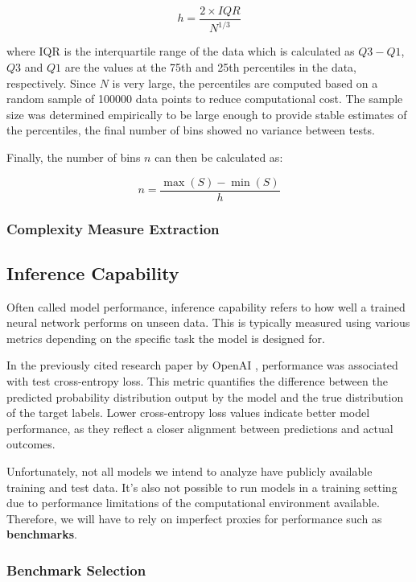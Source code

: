         \[ h = \frac{2 \times IQR}{N^{1/3}} \]

        where IQR is the interquartile range of the data which is calculated as \( Q3 - Q1 \), \( Q3 \) and \( Q1 \) are the values at the 75th and 25th percentiles in the data, respectively. Since \( N \) is very large, the percentiles are computed based on a random sample of 100000 data points to reduce computational cost. The sample size was determined empirically to be large enough to provide stable estimates of the percentiles, the final number of bins showed no variance between tests.

        Finally, the number of bins \( n \) can then be calculated as:

        \[ n = \frac{\max(S) - \min(S)}{h} \]

    \subsubsection{Complexity Measure Extraction}

\subsection{Inference Capability}

    Often called model performance, inference capability refers to how well a trained neural network performs on unseen data. This is typically measured using various metrics depending on the specific task the model is designed for. 
    
    In the previously cited research paper by OpenAI \cite{Kaplan2020}, performance was associated with test cross-entropy loss. This metric quantifies the difference between the predicted probability distribution output by the model and the true distribution of the target labels. Lower cross-entropy loss values indicate better model performance, as they reflect a closer alignment between predictions and actual outcomes.

    Unfortunately, not all models we intend to analyze have publicly available training and test data. It's also not possible to run models in a training setting due to performance limitations of the computational environment available. Therefore, we will have to rely on imperfect proxies for performance such as \textbf{benchmarks}.

    \subsubsection{Benchmark Selection}
    \label{sec:benchmark_selection}

